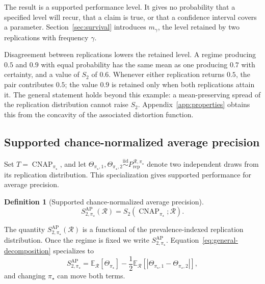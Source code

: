 \documentclass[11pt]{article}
\newcommand{\CNAP}{\operatorname{CNAP}}
\newcommand{\Regime}{\mathcal{R}}
\newcommand{\E}{\mathbb{E}}
\newcommand{\iid}{\mathrel{\overset{\mathrm{iid}}{\sim}}}
\newcommand{\SAPfull}{S_{2,\pi_\star}^{\mathrm{AP}}(\Regime)}
\newcommand{\SAP}{S_{2,\pi_\star}^{\mathrm{AP}}}
\newcommand{\PRep}{P_{\mathrm{rep}}^{\Regime,\pi_\star}}
\newtheorem{definition}{Definition}
\theoremstyle{remark}
\begin{document}
The result is a supported performance level. It gives no probability that a specified level will recur, that a claim is true, or that a confidence interval covers a parameter. Section~\ref{sec:survival} introduces $m_\gamma$, the level retained by two replications with frequency $\gamma$.

Disagreement between replications lowers the retained level. A regime producing $0.5$ and $0.9$ with equal probability has the same mean as one producing $0.7$ with certainty, and a value of $S_2$ of $0.6$. Whenever either replication returns $0.5$, the pair contributes $0.5$; the value $0.9$ is retained only when both replications attain it. The general statement holds beyond this example: a mean-preserving spread of the replication distribution cannot raise $S_2$. Appendix~\ref{app:properties} obtains this from the concavity of the associated distortion function.

\subsection{Supported chance-normalized average precision}

Set $T=\CNAP_{\pi_\star}$, and let $\Theta_{\pi_\star,1},\Theta_{\pi_\star,2}\iid\PRep$ denote two independent draws from its replication distribution. This specialization gives supported performance for average precision.

\begin{definition}[Supported chance-normalized average precision]
\begin{equation}
\SAPfull
=
S_2(\CNAP_{\pi_\star};\Regime).
\label{eq:rcap}
\end{equation}
\end{definition}

The quantity $\SAPfull$ is a functional of the prevalence-indexed replication distribution. Once the regime is fixed we write $\SAP$. Equation~\eqref{eq:general-decomposition} specializes to
\begin{equation}
\SAP
=
\E_{\Regime}[\Theta_{\pi_\star}]
-
\frac12
\E_{\Regime}
\left[
|\Theta_{\pi_\star,1}-\Theta_{\pi_\star,2}|
\right],
\label{eq:decomposition}
\end{equation}
and changing $\pi_\star$ can move both terms.

\begin{center}
\end{center}
\end{document}
